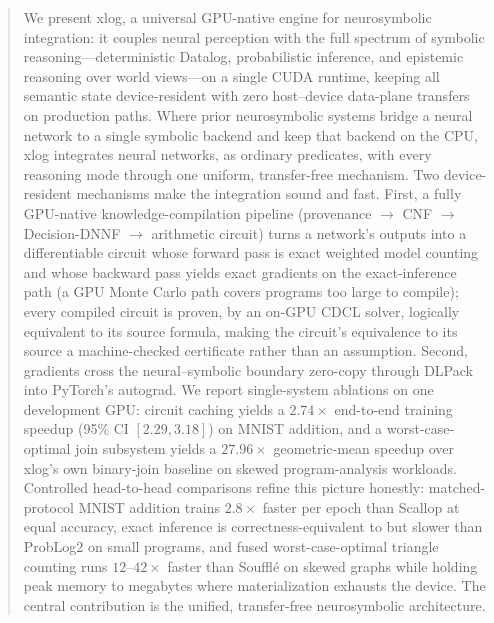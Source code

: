 \begin{abstract}
\noindent
We present xlog, a universal GPU-native engine for neurosymbolic integration: it couples neural perception with the full spectrum of symbolic reasoning---deterministic Datalog, probabilistic inference, and epistemic reasoning over world views---on a single CUDA runtime, keeping all semantic state device-resident with zero host--device data-plane transfers on production paths. Where prior neurosymbolic systems bridge a neural network to a single symbolic backend and keep that backend on the CPU, xlog integrates neural networks, as ordinary predicates, with every reasoning mode through one uniform, transfer-free mechanism. Two device-resident mechanisms make the integration sound and fast. First, a fully GPU-native knowledge-compilation pipeline (provenance $\to$ CNF $\to$ Decision-DNNF $\to$ arithmetic circuit) turns a network's outputs into a differentiable circuit whose forward pass is exact weighted model counting and whose backward pass yields exact gradients on the exact-inference path (a GPU Monte Carlo path covers programs too large to compile); every compiled circuit is proven, by an on-GPU CDCL solver, logically equivalent to its source formula, making the circuit's equivalence to its source a machine-checked certificate rather than an assumption. Second, gradients cross the neural--symbolic boundary zero-copy through DLPack into PyTorch's autograd. We report single-system ablations on one development GPU: circuit caching yields a $2.74\times$ end-to-end training speedup (95\% CI $[2.29, 3.18]$) on MNIST addition, and a worst-case-optimal join subsystem yields a $27.96\times$ geometric-mean speedup over xlog's own binary-join baseline on skewed program-analysis workloads. Controlled head-to-head comparisons refine this picture honestly: matched-protocol MNIST addition trains $2.8\times$ faster per epoch than Scallop at equal accuracy, exact inference is correctness-equivalent to but slower than ProbLog2 on small programs, and fused worst-case-optimal triangle counting runs $12$--$42\times$ faster than Soufflé on skewed graphs while holding peak memory to megabytes where materialization exhausts the device. The central contribution is the unified, transfer-free neurosymbolic architecture.
\end{abstract}
